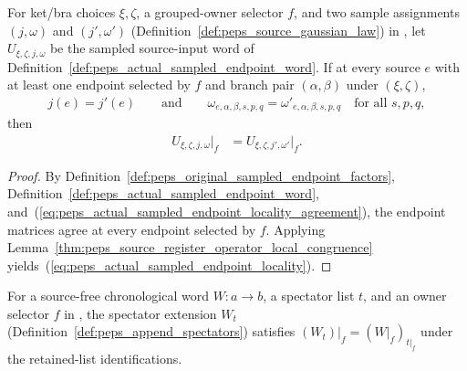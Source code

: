 \begin{lemma}
    \label{thm:peps_actual_sampled_endpoint_locality}
    \leanok
    For ket/bra choices $\xi,\zeta$, a grouped-owner selector $f$, and two sample
    assignments $(j,\omega)$ and $(j',\omega')$ (Definition~\ref{def:peps_source_gaussian_law})
    in \cite[proof of Theorem~5.2]{OpenAI2026PolynomialPEPS}, let
    $U_{\xi,\zeta,j,\omega}$ be the sampled source-input word of
    Definition~\ref{def:peps_actual_sampled_endpoint_word}. If at every source
    $e$ with at least one endpoint selected by $f$ and branch pair
    $(\alpha,\beta)$ under $(\xi,\zeta)$,
    \begin{align}
        j(e)=j'(e)
        \qquad\text{and}\qquad
        \omega_{e,\alpha,\beta,s,p,q}=\omega'_{e,\alpha,\beta,s,p,q}
        \quad\text{for all }s,p,q,
        \label{eq:peps_actual_sampled_endpoint_locality_agreement}
    \end{align}
    then
    \begin{align}
        U_{\xi,\zeta,j,\omega}|_f
         & =U_{\xi,\zeta,j',\omega'}|_f.
        \label{eq:peps_actual_sampled_endpoint_locality}
    \end{align}
\end{lemma}

\begin{proof}\leanok
    By Definition~\ref{def:peps_original_sampled_endpoint_factors},
    Definition~\ref{def:peps_actual_sampled_endpoint_word}, and~(\ref{eq:peps_actual_sampled_endpoint_locality_agreement}),
    the endpoint matrices agree at every endpoint selected by $f$.
    Applying Lemma~\ref{thm:peps_source_register_operator_local_congruence}
    yields~(\ref{eq:peps_actual_sampled_endpoint_locality}).
\end{proof}

\begin{lemma}
    \label{thm:peps_append_spectators_restriction}
    \leanok
    For a source-free chronological word $W:a\to b$, a spectator list $t$, and
    an owner selector $f$ in \cite[proof of Theorem~5.2]{OpenAI2026PolynomialPEPS},
    the spectator extension $W_t$ (Definition~\ref{def:peps_append_spectators})
    satisfies $(W_t)|_f=(W|_f)_{t|_f}$ under the retained-list identifications.
\end{lemma}

